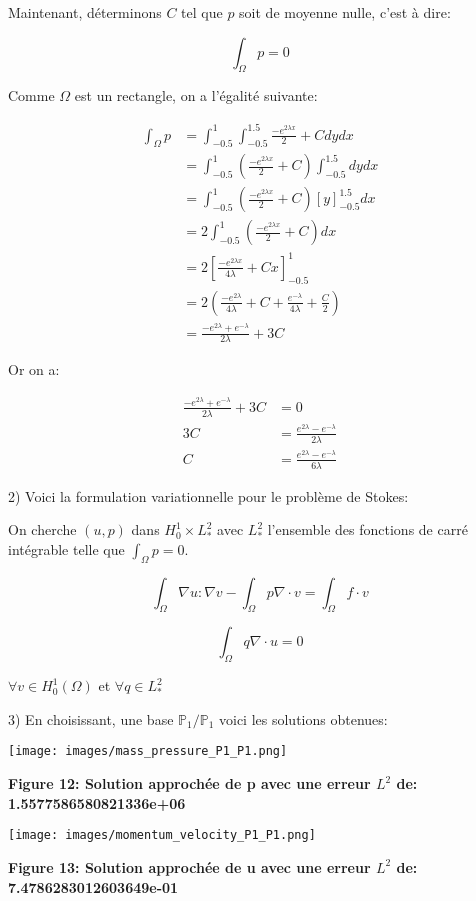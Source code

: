 \documentclass{article}
\begin{document}
Maintenant, déterminons $C$ tel que $p$ soit de moyenne nulle, c'est à dire:

$$\int_{\Omega} p = 0$$

Comme $\Omega$ est un rectangle, on a l'égalité suivante:

\begin{align*}
    \int_{\Omega} p &= \int^1_{-0.5} \int^{1.5}_{-0.5} \frac{-e^{2 \lambda x}}{2} + C dy dx \\
    &= \int^1_{-0.5} \left(\frac{-e^{2 \lambda x}}{2} + C\right) \int^{1.5}_{-0.5} dy dx \\
    &= \int^1_{-0.5} \left(\frac{-e^{2 \lambda x}}{2} + C\right) \left[ y \right]^{1.5}_{-0.5} dx \\
    &= 2 \int^1_{-0.5} \left(\frac{-e^{2 \lambda x}}{2} + C\right) dx \\
    &= 2 \left[ \frac{- e^{2 \lambda x}}{4 \lambda} + Cx \right]^1_{-0.5} \\
    &= 2 \left( \frac{- e^{2 \lambda}}{4 \lambda} + C + \frac{e^{-\lambda}}{4 \lambda} + \frac{C}{2}\right) \\
    &= \frac{-e^{2 \lambda} + e^{-\lambda}} {2 \lambda} + 3C
\end{align*}

Or on a:

\begin{align*}
    \frac{-e^{2 \lambda} + e^{-\lambda}} {2 \lambda} + 3C &= 0 \\
    3C &= \frac{ e^{2 \lambda} - e^{-\lambda}} {2 \lambda} \\
    C &= \frac{ e^{2 \lambda} - e^{-\lambda}} {6 \lambda}
\end{align*}

2) Voici la formulation variationnelle pour le problème de Stokes:

On cherche $(u,p)$ dans $H^1_0 \times L^2_*$ avec $L^2_*$ l'ensemble des fonctions de carré intégrable telle que $\int_{\Omega} p = 0$.

$$\int_{\Omega} \nabla u:\nabla v - \int_{\Omega} p \nabla \cdot v = \int_{\Omega} f \cdot v $$

$$\int_{\Omega}q \nabla \cdot u = 0 $$

$\forall v \in H^1_0(\Omega)$ et $\forall q \in L^2_*$

3) En choisissant, une base $\mathbb{P}_1/\mathbb{P}_1$ voici les solutions obtenues:

\texttt{[image: images/mass\_pressure\_P1\_P1.png]}
\begin{center}
    \textbf{Figure 12: Solution approchée de p avec une erreur $L^2$ de: 1.5577586580821336e+06}
\end{center}
\texttt{[image: images/momentum\_velocity\_P1\_P1.png]}
\begin{center}
    \textbf{Figure 13: Solution approchée de u avec une erreur $L^2$ de: 7.4786283012603649e-01}
\end{center}
\end{document}
